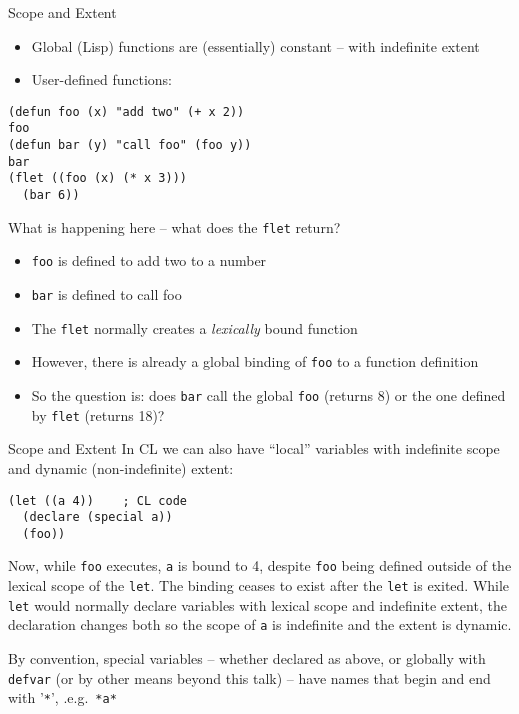 \documentclass[presentation]{beamer}
\begin{document}
\begin{frame}[fragile]{Scope and Extent}
  \begin{itemize}
  \item Global (Lisp) functions are (essentially) constant -- with indefinite extent
  \item User-defined functions:
  \end{itemize}
\begin{verbatim}
(defun foo (x) "add two" (+ x 2))
foo
(defun bar (y) "call foo" (foo y))
bar
(flet ((foo (x) (* x 3)))
  (bar 6))
\end{verbatim}
What is happening here -- what does the \texttt{flet} return?
\begin{itemize}
\item \texttt{foo} is defined to add two to a number
\item \texttt{bar} is defined to call foo
\item The \texttt{flet} normally creates a \emph{lexically} bound function
\item However, there is already a global binding of \texttt{foo} to a function definition
\item So the question is: does \texttt{bar} call the global \texttt{foo} (returns 8) or the one defined by \texttt{flet} (returns 18)?
\end{itemize}

\end{frame}

\begin{frame}[fragile]{Scope and Extent}
In CL we can also have ``local'' variables with indefinite scope and dynamic (non-indefinite) extent:
\begin{verbatim}
(let ((a 4))    ; CL code
  (declare (special a))
  (foo))
\end{verbatim}
Now, while \texttt{foo} executes, \texttt{a} is bound to 4, despite \texttt{foo} being defined outside of the lexical scope of the \texttt{let}.  The binding ceases to exist after the \texttt{let} is exited.  While \texttt{let} would normally declare variables with lexical scope and indefinite extent, the declaration changes both so the scope of \texttt{a} is indefinite and the extent is dynamic.

\medskip
By convention, special variables -- whether declared as above, or globally with \texttt{defvar} (or by other means beyond this talk) -- have names that begin and end with '\texttt{*}', .e.g.\ \texttt{*a*}
\end{frame}
\end{document}
